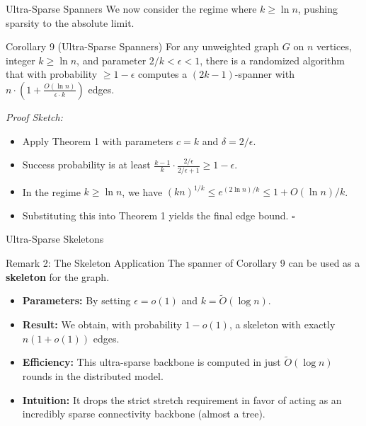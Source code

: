 \documentclass{beamer}
\begin{document}
\begin{frame}{Ultra-Sparse Spanners}
    We now consider the regime where $k \ge \ln n$, pushing sparsity to the absolute limit.
    
    \vspace{0.2cm}
    \begin{block}{Corollary 9 (Ultra-Sparse Spanners)}
        For any unweighted graph $G$ on $n$ vertices, integer $k \ge \ln n$, and parameter $2/k < \epsilon < 1$, there is a randomized algorithm that with probability $\ge 1 - \epsilon$ computes a $(2k - 1)$-spanner with $n \cdot \left(1 + \frac{O(\ln n)}{\epsilon \cdot k}\right)$ edges.
    \end{block}
    
    \vspace{0.2cm}
    \small
    \textit{Proof Sketch:}
    \begin{itemize}
        \item Apply Theorem 1 with parameters $c = k$ and $\delta = 2/\epsilon$.
        \item Success probability is at least $\frac{k-1}{k} \cdot \frac{2/\epsilon}{2/\epsilon + 1} \ge 1 - \epsilon$.
        \item In the regime $k \ge \ln n$, we have $(kn)^{1/k} \le e^{(2\ln n)/k} \le 1 + O(\ln n)/k$.
        \item Substituting this into Theorem 1 yields the final edge bound. \hfill $\square$
    \end{itemize}
\end{frame}

\begin{frame}{Ultra-Sparse Skeletons}
    \begin{block}{Remark 2: The Skeleton Application}
        The spanner of Corollary 9 can be used as a \textbf{skeleton} for the graph.
    \end{block}
    
    \vspace{0.3cm}
    \begin{itemize}
        \item \textbf{Parameters:} By setting $\epsilon = o(1)$ and $k = \tilde{O}(\log n)$.
        \item \textbf{Result:} We obtain, with probability $1 - o(1)$, a skeleton with exactly $n(1 + o(1))$ edges.
        \item \textbf{Efficiency:} This ultra-sparse backbone is computed in just $\tilde{O}(\log n)$ rounds in the distributed model.
        \item \textbf{Intuition:} It drops the strict stretch requirement in favor of acting as an incredibly sparse connectivity backbone (almost a tree).
    \end{itemize}
\end{frame}
\end{document}
